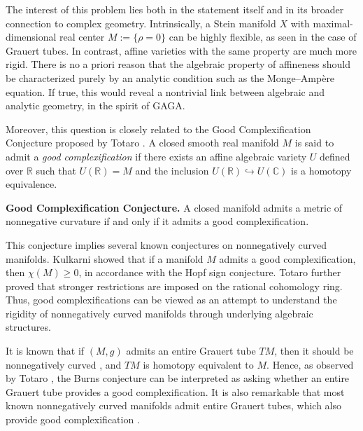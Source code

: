 \documentclass[a4paper, 12pt]{article}
\begin{document}
The interest of this problem lies both in the statement itself and in its broader connection to complex geometry. Intrinsically, a Stein manifold $X$ with maximal-dimensional real center $M:=\{\rho=0\}$ can be highly flexible, as seen in the case of Grauert tubes. In contrast, affine varieties with the same property are much more rigid. There is no a priori reason that the algebraic property of affineness should be characterized purely by an analytic condition such as the Monge--Amp\`ere equation. If true, this would reveal a nontrivial link between algebraic and analytic geometry, in the spirit of GAGA.

Moreover, this question is closely related to the Good Complexification Conjecture proposed by Totaro \cite{T03}. A closed smooth real manifold $M$ is said to admit a \emph{good complexification} if there exists an affine algebraic variety $U$ defined over $\mathbb{R}$ such that $U(\mathbb{R}) = M$ and the inclusion $U(\mathbb{R}) \hookrightarrow U(\mathbb{C})$ is a homotopy equivalence.

\medskip

\noindent
\textbf{Good Complexification Conjecture.} A closed manifold admits a metric of nonnegative curvature if and only if it admits a good complexification.

\medskip

This conjecture implies several known conjectures on nonnegatively curved manifolds. Kulkarni \cite{K78} showed that if a manifold $M$ admits a good complexification, then $\chi(M) \ge 0$, in accordance with the Hopf sign conjecture. Totaro \cite{T03} further proved that stronger restrictions are imposed on the rational cohomology ring. Thus, good complexifications can be viewed as an attempt to understand the rigidity of nonnegatively curved manifolds through underlying algebraic structures.

It is known that if $(M,g)$ admits an entire Grauert tube $TM$, then it should be nonnegatively curved \cite{LS91}, and $TM$ is homotopy equivalent to $M$. Hence, as observed by Totaro \cite{T03}, the Burns conjecture can be interpreted as asking whether an entire Grauert tube provides a good complexification. It is also remarkable that most known nonnegatively curved manifolds admit entire Grauert tubes, which also provide good complexification \cite{A01}.
\end{document}
